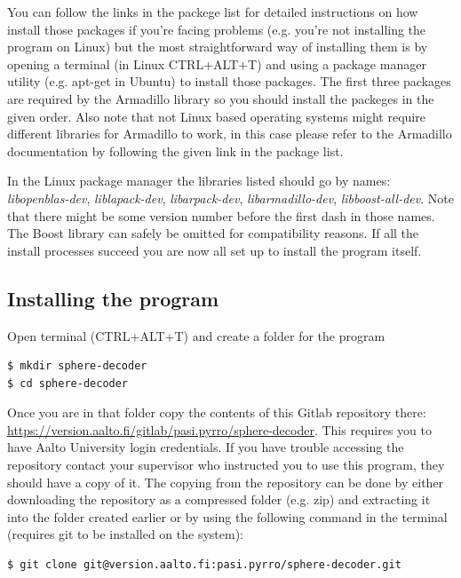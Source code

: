 \documentclass[english,12pt,a4paper,pdftex,sci,utf8]{aaltothesis}
\begin{document}
You can follow the links in the packege list for detailed instructions on how install those packages if you're facing problems (e.g. you're not installing the program on Linux) but the most straightforward way of installing them is by opening a terminal (in Linux CTRL+ALT+T) and using a package manager utility (e.g. apt-get in Ubuntu) to install those packages. The first three packages are required by the Armadillo library so you should install the packeges in the given order. Also note that not Linux based operating systems might require different libraries for Armadillo to work, in this case please refer to the Armadillo documentation by following the given link in the package list. 
\par In the Linux package manager the libraries listed should go by names: \textit{libopenblas-dev}, \textit{liblapack-dev}, \textit{libarpack-dev}, \textit{libarmadillo-dev}, \textit{libboost-all-dev}. %
Note that there might be some version number before the first dash in those names. The Boost library can safely be omitted for compatibility reasons. If all the install processes succeed you are now all set up to install the program itself.

\subsection{Installing the program}

Open terminal (CTRL+ALT+T) and create a folder for the program 
\begin{verbatim}
$ mkdir sphere-decoder
$ cd sphere-decoder
\end{verbatim}Once you are in that folder copy the contents of this Gitlab repository there: \url{https://version.aalto.fi/gitlab/pasi.pyrro/sphere-decoder}. This requires you to have Aalto University login credentials. If you have trouble accessing the repository contact your supervisor who instructed you to use this program, they should have a copy of it. The copying from the repository can be done by either downloading the repository as a compressed folder (e.g. zip) and extracting it into the folder created earlier or by using the following command in the terminal (requires git to be installed on the system):
\begin{verbatim}
$ git clone git@version.aalto.fi:pasi.pyrro/sphere-decoder.git
\end{verbatim}
\end{document}
